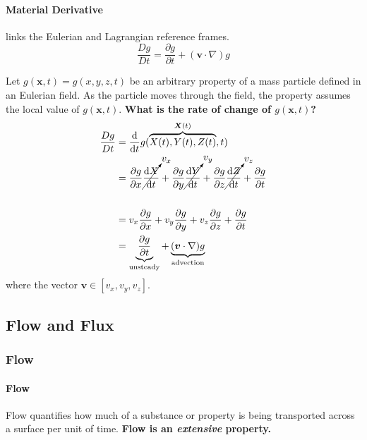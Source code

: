 \documentclass[12pt, a4paper]{article}
\begin{document}
\paragraph{Material Derivative} links the Eulerian and Lagrangian reference frames.
\[ 
    \frac{Dg}{Dt} = \frac{\partial g}{\partial t}+ (\bm{v} \cdot \nabla)g 
\]
 
\begin{tcolorbox}[breakable, title=\textbf{Derivation}] 
Let $g(\bm{x}, t) = g(x, y, z, t)$ be an arbitrary property of a mass particle defined in an Eulerian field. As the particle moves through the field, the property assumes the local value of $g(\bm{x}, t)$. \textbf{What is the rate of change of $g(\bm{x}, t)$?}
\begin{align*} 
\begin{split}
\frac{Dg}{Dt} 
& =\frac{\mathrm{d}}{\mathrm{d}t}g(\overbrace{X(t),Y(t),Z(t)}^{\bm{X}(t)},t) \\
& = \frac{\partial g}{\partial x} \cancelto{v_{x}}{\frac{\mathrm{d}X}{\mathrm{d}t}} + \frac{\partial g}{\partial y} \cancelto{v_{y}}{\frac{\mathrm{d}Y}{\mathrm{d}t}} + \frac{\partial g}{\partial z} \cancelto{v_{z}}{\frac{\mathrm{d}Z}{\mathrm{d}t}} + \frac{\partial g}{\partial t}\\\\
& = v_{x}\frac{\partial g}{\partial x} + v_{y}\frac{\partial g}{\partial y} + v_{z}\frac{\partial g}{\partial z} + \frac{\partial g}{\partial t}\\
& = \underbrace{\frac{\partial g}{\partial t}}_{\text{unsteady}} + \underbrace{(\bm{v} \cdot \nabla)g}_{\text{advection}}
\end{split} 
\end{align*}
where the vector $\bm{v} \in [v_x, v_y, v_z]$.
\end{tcolorbox}

\subsection{Flow and Flux}
\subsubsection{Flow}
\paragraph{Flow} Flow quantifies how much of a substance or property is being transported across a surface per unit of time. \textbf{Flow is an \emph{extensive} property.}
\end{document}
